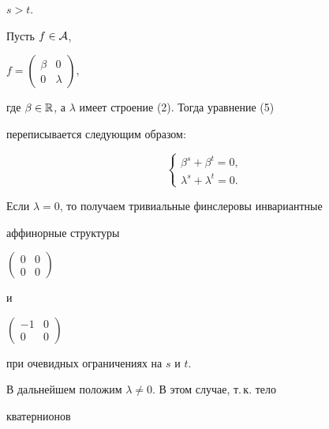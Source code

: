 $s>t$. 


 


Пусть $f\in\cal A$, 


$f=


\begin{pmatrix}


\beta&0\\ 0&\lambda


\end{pmatrix}


$,


где $\beta\in\Bbb R$, а $\lambda$ имеет строение (2). Тогда уравнение (5) 


переписывается следующим образом: 


\begin{equation} 


\begin{cases} 


\beta^s+\beta^t=0,\\ 


\lambda^s+\lambda^t=0. 


\end{cases} 


\end{equation} 


Если $\lambda=0$, то получаем тривиальные финслеровы инвариантные 


аффинорные структуры 


$


\begin{pmatrix}


0&0\\ 0&0


\end{pmatrix}


$


и 


$


\begin{pmatrix}


-1&0\\ 0&0


\end{pmatrix}


$


при очевидных ограничениях на $s$ и $t$. 


 


В дальнейшем положим $\lambda\ne 0$. В этом случае, т.\,к. тело 


кватернионов 



